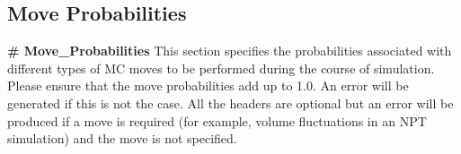%
%
%
\subsection{Move Probabilities}\label{sec:Move_Probabilities}
{\bf \# Move\_Probabilities} 
%
This section specifies the probabilities associated with different types of
MC moves to be performed during the course of simulation. Please ensure that
the move probabilities add up to 1.0. An error will be generated if this is
not the case. All the headers are optional but an error will be produced if
a move is required (for example, volume fluctuations in an NPT simulation) and
the move is not specified. 
%
%
%
%
%
%
